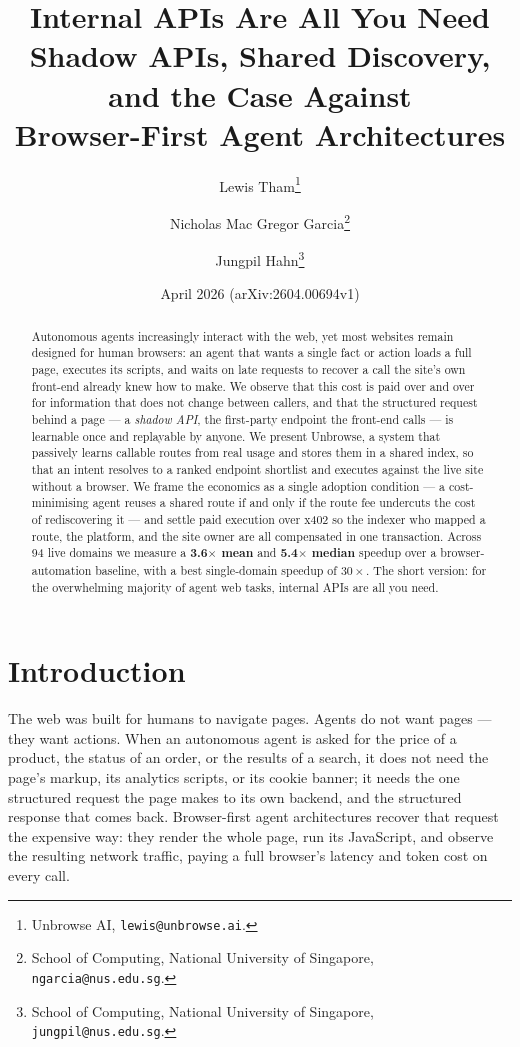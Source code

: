 \documentclass[11pt]{article}
\title{\textbf{Internal APIs Are All You Need}\\
\large Shadow APIs, Shared Discovery, and the Case Against\\
Browser-First Agent Architectures}
\author{Lewis Tham\thanks{Unbrowse AI, \texttt{lewis@unbrowse.ai}.}
  \and Nicholas Mac Gregor Garcia\thanks{School of Computing, National University
  of Singapore, \texttt{ngarcia@nus.edu.sg}.}
  \and Jungpil Hahn\thanks{School of Computing, National University of Singapore,
  \texttt{jungpil@nus.edu.sg}.}}
\date{April 2026 \quad(arXiv:2604.00694v1)}
\begin{document}
\maketitle

\begin{abstract}
Autonomous agents increasingly interact with the web, yet most websites remain
designed for human browsers: an agent that wants a single fact or action loads a
full page, executes its scripts, and waits on late requests to recover a call the
site's own front-end already knew how to make. We observe that this cost is paid
over and over for information that does not change between callers, and that the
structured request behind a page --- a \emph{shadow API}, the first-party endpoint
the front-end calls --- is learnable once and replayable by anyone. We present
Unbrowse, a system that passively learns callable routes from real usage and stores
them in a shared index, so that an intent resolves to a ranked endpoint shortlist
and executes against the live site without a browser. We frame the economics as a
single adoption condition --- a cost-minimising agent reuses a shared route if and
only if the route fee undercuts the cost of rediscovering it --- and settle paid
execution over x402 so the indexer who mapped a route, the platform, and the site
owner are all compensated in one transaction. Across 94 live domains we measure a
\textbf{3.6$\times$ mean} and \textbf{5.4$\times$ median} speedup over a
browser-automation baseline, with a best single-domain speedup of $30\times$. The
short version: for the overwhelming majority of agent web tasks, internal APIs are
all you need.
\end{abstract}

\section{Introduction}
The web was built for humans to navigate pages. Agents do not want pages --- they
want actions. When an autonomous agent is asked for the price of a product, the
status of an order, or the results of a search, it does not need the page's markup,
its analytics scripts, or its cookie banner; it needs the one structured request
the page makes to its own backend, and the structured response that comes back.
Browser-first agent architectures recover that request the expensive way: they
render the whole page, run its JavaScript, and observe the resulting network
traffic, paying a full browser's latency and token cost on every call.
\end{document}

